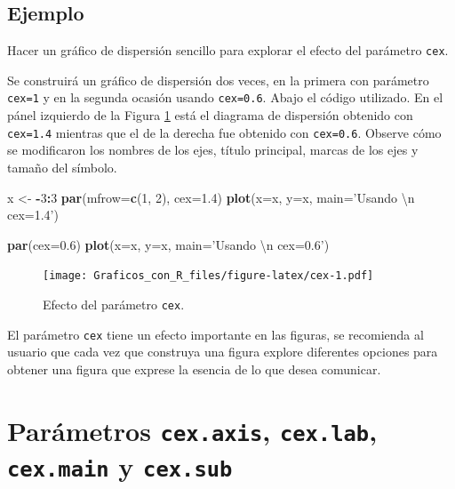 \documentclass[10pt,]{krantz}
\makeatletter
\newenvironment{Shaded}{\begin{snugshade}}{\end{snugshade}}
\newcommand{\KeywordTok}[1]{\textcolor[rgb]{0.13,0.29,0.53}{\textbf{#1}}}
\newcommand{\DataTypeTok}[1]{\textcolor[rgb]{0.13,0.29,0.53}{#1}}
\newcommand{\DecValTok}[1]{\textcolor[rgb]{0.00,0.00,0.81}{#1}}
\newcommand{\FloatTok}[1]{\textcolor[rgb]{0.00,0.00,0.81}{#1}}
\newcommand{\CharTok}[1]{\textcolor[rgb]{0.31,0.60,0.02}{#1}}
\newcommand{\StringTok}[1]{\textcolor[rgb]{0.31,0.60,0.02}{#1}}
\newcommand{\OperatorTok}[1]{\textcolor[rgb]{0.81,0.36,0.00}{\textbf{#1}}}
\newcommand{\NormalTok}[1]{#1}
\newenvironment{kframe}{%
\medskip{}
\setlength{\fboxsep}{.8em}
 \def\at@end@of@kframe{}%
 \ifinner\ifhmode%
  \def\at@end@of@kframe{\end{minipage}}%
  \begin{minipage}{\columnwidth}%
 \fi\fi%
 \def\FrameCommand##1{\hskip\@totalleftmargin \hskip-\fboxsep
 \colorbox{shadecolor}{##1}\hskip-\fboxsep
     \hskip-\linewidth \hskip-\@totalleftmargin \hskip\columnwidth}%
 \MakeFramed {\advance\hsize-\width
   \@totalleftmargin\z@ \linewidth\hsize
   \@setminipage}}%
 {\par\unskip\endMakeFramed%
 \at@end@of@kframe}
\renewenvironment{Shaded}{\begin{kframe}}{\end{kframe}}
\makeatother
\begin{document}
\subsection*{Ejemplo}\label{ejemplo-38}


Hacer un gráfico de dispersión sencillo para explorar el efecto del
parámetro \texttt{cex}.

Se construirá un gráfico de dispersión dos veces, en la primera con
parámetro \texttt{cex=1} y en la segunda ocasión usando
\texttt{cex=0.6}. Abajo el código utilizado. En el pánel izquierdo de la
Figura \ref{fig:cex} está el diagrama de dispersión obtenido con
\texttt{cex=1.4} mientras que el de la derecha fue obtenido con
\texttt{cex=0.6}. Observe cómo se modificaron los nombres de los ejes,
título principal, marcas de los ejes y tamaño del símbolo.

\begin{Shaded}
\begin{Highlighting}[]
\NormalTok{x <-}\StringTok{ }\OperatorTok{-}\DecValTok{3}\OperatorTok{:}\DecValTok{3}
\KeywordTok{par}\NormalTok{(}\DataTypeTok{mfrow=}\KeywordTok{c}\NormalTok{(}\DecValTok{1}\NormalTok{, }\DecValTok{2}\NormalTok{), }\DataTypeTok{cex=}\FloatTok{1.4}\NormalTok{)}
\KeywordTok{plot}\NormalTok{(}\DataTypeTok{x=}\NormalTok{x, }\DataTypeTok{y=}\NormalTok{x, }\DataTypeTok{main=}\StringTok{'Usando }\CharTok{\textbackslash{}n}\StringTok{ cex=1.4'}\NormalTok{)}

\KeywordTok{par}\NormalTok{(}\DataTypeTok{cex=}\FloatTok{0.6}\NormalTok{)}
\KeywordTok{plot}\NormalTok{(}\DataTypeTok{x=}\NormalTok{x, }\DataTypeTok{y=}\NormalTok{x, }\DataTypeTok{main=}\StringTok{'Usando }\CharTok{\textbackslash{}n}\StringTok{ cex=0.6'}\NormalTok{)}
\end{Highlighting}
\end{Shaded}

\begin{figure}
\centering
\texttt{[image: Graficos\_con\_R\_files/figure-latex/cex-1.pdf]}
\caption{\label{fig:cex}Efecto del parámetro \texttt{cex}.}
\end{figure}

El parámetro \texttt{cex} tiene un efecto importante en las figuras, se
recomienda al usuario que cada vez que construya una figura explore
diferentes opciones para obtener una figura que exprese la esencia de lo
que desea comunicar.

\section{\texorpdfstring{Parámetros \texttt{cex.axis}, \texttt{cex.lab},
\texttt{cex.main} y \texttt{cex.sub}  
}{Parámetros cex.axis, cex.lab, cex.main y cex.sub    }}\label{parametros-cex.axis-cex.lab-cex.main-y-cex.sub}
\end{document}
